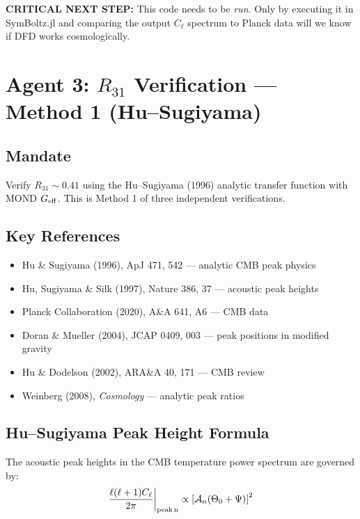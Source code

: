 \documentclass[11pt,a4paper]{article}
\begin{document}
\textbf{CRITICAL NEXT STEP:} This code needs to be \emph{run}. Only by executing it in SymBoltz.jl and comparing the output $C_\ell$ spectrum to Planck data will we know if DFD works cosmologically.

\section{Agent 3: $R_{31}$ Verification --- Method 1 (Hu--Sugiyama)}
\label{sec:agent3}

\subsection{Mandate}

Verify $R_{31} \sim 0.41$ using the Hu--Sugiyama (1996) analytic transfer function with MOND $G_{\rm eff}$. This is Method 1 of three independent verifications.

\subsection{Key References}

\begin{itemize}
\item Hu \& Sugiyama (1996), ApJ 471, 542 --- analytic CMB peak physics
\item Hu, Sugiyama \& Silk (1997), Nature 386, 37 --- acoustic peak heights
\item Planck Collaboration (2020), A\&A 641, A6 --- CMB data
\item Doran \& Mueller (2004), JCAP 0409, 003 --- peak positions in modified gravity
\item Hu \& Dodelson (2002), ARA\&A 40, 171 --- CMB review
\item Weinberg (2008), \emph{Cosmology} --- analytic peak ratios
\end{itemize}

\subsection{Hu--Sugiyama Peak Height Formula}

The acoustic peak heights in the CMB temperature power spectrum are governed by:
\begin{equation}
\frac{\ell(\ell+1)C_\ell}{2\pi}\bigg|_{\rm peak\,n} \propto \left[\mathcal{A}_n(\Theta_0 + \Psi)\right]^2
\end{equation}
\end{document}
